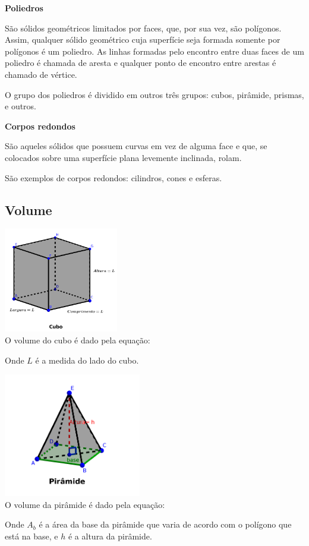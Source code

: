  \textbf{Poliedros}

 São sólidos geométricos limitados por faces, que, por sua vez, são polígonos. Assim, qualquer sólido geométrico cuja superfície seja formada somente por polígonos é um poliedro. As linhas formadas pelo encontro entre duas faces de um poliedro é chamada de aresta e qualquer ponto de encontro entre arestas é chamado de vértice.

O grupo dos poliedros é dividido em outros três grupos: cubos, pirâmide, prismas, e outros.

\textbf{Corpos redondos}

São aqueles sólidos que possuem curvas em vez de alguma face e que, se colocados sobre uma superfície plana levemente inclinada, rolam.

São exemplos de corpos redondos: cilindros, cones e esferas.

 \newpage
\subsection{Volume}

\begin{multicols}{2}
 \includegraphics[width=5cm]{./cap_geometria/figs/cubo} \\

 O volume do cubo é dado pela equação:
 
 
 Onde $L$ é a medida do lado do cubo.
\end{multicols}

\begin{multicols}{2}
 \includegraphics[width=6cm]{./cap_geometria/figs/piramide_quadrada} \\
 O volume da pirâmide é dado pela equação:
 
 
 Onde $A_b$ é a área da base da pirâmide que varia de acordo com o polígono que está na base, e $h$ é a altura da pirâmide.
\end{multicols}

